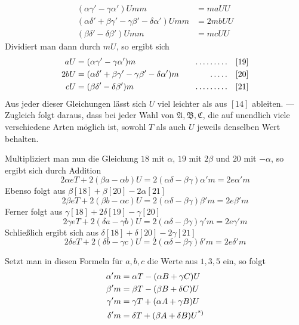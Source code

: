 \[
\begin{aligned}
(\alpha\gamma'-\gamma\alpha')Umm&=maUU\\
(\alpha\delta'+\beta\gamma'-\gamma\beta'-\delta\alpha')Umm&=2mbUU\\
(\beta\delta'-\delta\beta')Umm&=mcUU
\end{aligned}
\]
Dividiert man dann durch $mU$, so ergibt sich
\[
\begin{aligned}
aU&=(\alpha\gamma'-\gamma\alpha')m&\quad\mathinner{.\,.\,.\,.\,.\,.\,.\,.\,.}\quad&[19]\\
2bU&=(\alpha\delta'+\beta\gamma'-\gamma\beta'-\delta\alpha')m&\quad\mathinner{.\,.\,.\,.\,.}\quad&[20]\\
cU&=(\beta\delta'-\delta\beta')m&\quad\mathinner{.\,.\,.\,.\,.\,.\,.\,.\,.}\quad&[21]
\end{aligned}
\]
Aus jeder dieser Gleichungen lässt sich $U$ viel leichter als aus $[14]$ ableiten. --- Zugleich folgt daraus, dass bei jeder Wahl von $\mathfrak{A},\mathfrak{B},\mathfrak{C}$, die auf unendlich viele verschiedene Arten möglich ist, sowohl $T$ als auch $U$ jeweils denselben Wert behalten.

Multipliziert man nun die Gleichung $18$ mit $\alpha$, $19$ mit $2\beta$ und $20$ mit $-\alpha$, so ergibt sich durch Addition
\[
2\alpha eT+2(\beta a-\alpha b)U=2(\alpha\delta-\beta\gamma)\alpha'm=2e\alpha'm
\]
Ebenso folgt aus $\beta[18]+\beta[20]-2\alpha[21]$
\[
2\beta eT+2(\beta b-\alpha c)U=2(\alpha\delta-\beta\gamma)\beta'm=2e\beta'm
\]
Ferner folgt aus $\gamma[18]+2\delta[19]-\gamma[20]$
\[
2\gamma eT+2(\delta a-\gamma b)U=2(\alpha\delta-\beta\gamma)\gamma'm=2e\gamma'm
\]
Schließlich ergibt sich aus $\delta[18]+\delta[20]-2\gamma[21]$
\[
2\delta eT+2(\delta b-\gamma c)U=2(\alpha\delta-\beta\gamma)\delta'm=2e\delta'm
\]

Setzt man in diesen Formeln für $a,b,c$ die Werte aus $1,3,5$ ein, so folgt
\[
\begin{aligned}
\alpha'm&=\alpha T-(\alpha B+\gamma C)U\\
\beta'm&=\beta T-(\beta B+\delta C)U\\
\gamma'm&=\gamma T+(\alpha A+\gamma B)U\\
\delta'm&=\delta T+(\beta A+\delta B)U\text{\textsuperscript{*)}}
\end{aligned}
\]


